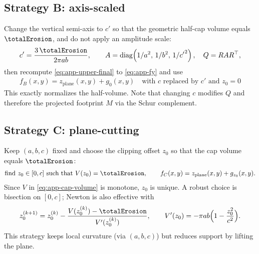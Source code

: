\subsection*{Strategy B: axis-scaled}
Change the vertical semi-axis to $c'$ so that the geometric half-cap volume equals $\totalErosion$, and do not apply an amplitude scale:
\begin{align}
    \label{eq:app-stratB}
    c'=\frac{3\,\totalErosion}{2\pi a b},\qquad
    A=\operatorname{diag}\!\left(1/a^2,\,1/b^2,\,1/{c'}^{2}\right),\quad Q=RAR^\top,
\end{align}
then recompute \cref{eq:app-upper-final} to \cref{eq:app-fy} and use
\begin{align}
    f_B(x,y)=z_{\text{plane}}(x,y)+g_{0}(x,y)\quad\text{with $c$ replaced by $c'$ and $z_0=0$}
\end{align}
This exactly normalizes the half-volume. Note that changing $c$ modifies $Q$ and therefore the projected footprint $M$ via the Schur complement.

\subsection*{Strategy C: plane-cutting}
Keep $(a,b,c)$ fixed and choose the clipping offset $z_0$ so that the cap volume equals $\totalErosion$:
\begin{align}
    \label{eq:app-stratC}
    \text{find }z_0\in[0,c]\ \text{such that}\ V(z_0)=\totalErosion,\qquad f_C(x,y)=z_{\text{plane}}(x,y)+g_{z_0}(x,y).
\end{align}
Since $V$ in \cref{eq:app-cap-volume} is monotone, $z_0$ is unique. A robust choice is bisection on $[0,c]$; Newton is also effective with
\begin{align}
    z_0^{(k+1)}=z_0^{(k)}-\frac{V(z_0^{(k)})-\totalErosion}{V'(z_0^{(k)})},\qquad
    V'(z_0)=-\pi a b\Bigl(1-\frac{z_0^2}{c^2}\Bigr).
\end{align}
This strategy keeps local curvature (via $(a,b,c)$) but reduces support by lifting the plane.



